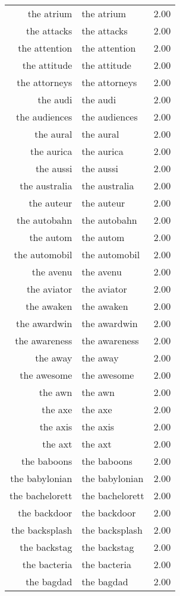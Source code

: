 \begin{table}[ht]
\begin{tabular}{rlr}
  the atrium & the atrium & 2.00 \\ 
  the attacks & the attacks & 2.00 \\ 
  the attention & the attention & 2.00 \\ 
  the attitude & the attitude & 2.00 \\ 
  the attorneys & the attorneys & 2.00 \\ 
  the audi & the audi & 2.00 \\ 
  the audiences & the audiences & 2.00 \\ 
  the aural & the aural & 2.00 \\ 
  the aurica & the aurica & 2.00 \\ 
  the aussi & the aussi & 2.00 \\ 
  the australia & the australia & 2.00 \\ 
  the auteur & the auteur & 2.00 \\ 
  the autobahn & the autobahn & 2.00 \\ 
  the autom & the autom & 2.00 \\ 
  the automobil & the automobil & 2.00 \\ 
  the avenu & the avenu & 2.00 \\ 
  the aviator & the aviator & 2.00 \\ 
  the awaken & the awaken & 2.00 \\ 
  the awardwin & the awardwin & 2.00 \\ 
  the awareness & the awareness & 2.00 \\ 
  the away & the away & 2.00 \\ 
  the awesome & the awesome & 2.00 \\ 
  the awn & the awn & 2.00 \\ 
  the axe & the axe & 2.00 \\ 
  the axis & the axis & 2.00 \\ 
  the axt & the axt & 2.00 \\ 
  the baboons & the baboons & 2.00 \\ 
  the babylonian & the babylonian & 2.00 \\ 
  the bachelorett & the bachelorett & 2.00 \\ 
  the backdoor & the backdoor & 2.00 \\ 
  the backsplash & the backsplash & 2.00 \\ 
  the backstag & the backstag & 2.00 \\ 
  the bacteria & the bacteria & 2.00 \\ 
  the bagdad & the bagdad & 2.00 \\ 

\end{tabular}
\end{table}
